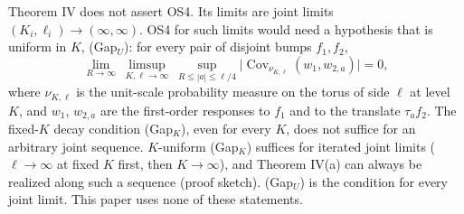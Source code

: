 \begin{remark}\label{rem:GapU}
Theorem IV does not assert OS4. Its limits are joint limits $(K_i,\ell_i)\to(\infty,\infty)$. OS4 for such limits would need a hypothesis that is uniform in $K$, (Gap$_U$): for every pair of disjoint bumps $f_1,f_2$,
\[
\lim_{R\to\infty}\ \limsup_{K,\ell\to\infty}\ \sup_{R\le|a|\le\ell/4}\bigl|\operatorname{Cov}_{\nu_{K,\ell}}(w_1,w_{2,a})\bigr|=0,
\]
where $\nu_{K,\ell}$ is the unit-scale probability measure on the torus of side $\ell$ at level $K$, and $w_1$, $w_{2,a}$ are the first-order responses to $f_1$ and to the translate $\tau_af_2$. The fixed-$K$ decay condition (Gap$_K$), even for every $K$, does not suffice for an arbitrary joint sequence. $K$-uniform (Gap$_K$) suffices for iterated joint limits ($\ell\to\infty$ at fixed $K$ first, then $K\to\infty$), and Theorem IV(a) can always be realized along such a sequence (proof sketch). (Gap$_U$) is the condition for every joint limit. This paper uses none of these statements.
\end{remark}
